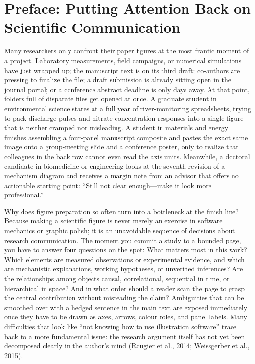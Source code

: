 \chapter*{Preface: Putting Attention Back on Scientific Communication}

Many researchers only confront their paper figures at the most frantic moment of a project. Laboratory measurements, field campaigns, or numerical simulations have just wrapped up; the manuscript text is on its third draft; co-authors are pressing to finalize the file; a draft submission is already sitting open in the journal portal; or a conference abstract deadline is only days away. At that point, folders full of disparate files get opened at once. A graduate student in environmental science stares at a full year of river-monitoring spreadsheets, trying to pack discharge pulses and nitrate concentration responses into a single figure that is neither cramped nor misleading. A student in materials and energy finishes assembling a four-panel manuscript composite and pastes the exact same image onto a group-meeting slide and a conference poster, only to realize that colleagues in the back row cannot even read the axis units. Meanwhile, a doctoral candidate in biomedicine or engineering looks at the seventh revision of a mechanism diagram and receives a margin note from an advisor that offers no actionable starting point: ``Still not clear enough---make it look more professional.''

Why does figure preparation so often turn into a bottleneck at the finish line? Because making a scientific figure is never merely an exercise in software mechanics or graphic polish; it is an unavoidable sequence of decisions about research communication. The moment you commit a study to a bounded page, you have to answer four questions on the spot: What matters most in this work? Which elements are measured observations or experimental evidence, and which are mechanistic explanations, working hypotheses, or unverified inferences? Are the relationships among objects causal, correlational, sequential in time, or hierarchical in space? And in what order should a reader scan the page to grasp the central contribution without misreading the claim? Ambiguities that can be smoothed over with a hedged sentence in the main text are exposed immediately once they have to be drawn as axes, arrows, colour roles, and panel labels. Many difficulties that look like ``not knowing how to use illustration software'' trace back to a more fundamental issue: the research argument itself has not yet been decomposed clearly in the author's mind (Rougier et al., 2014; Weissgerber et al., 2015).

